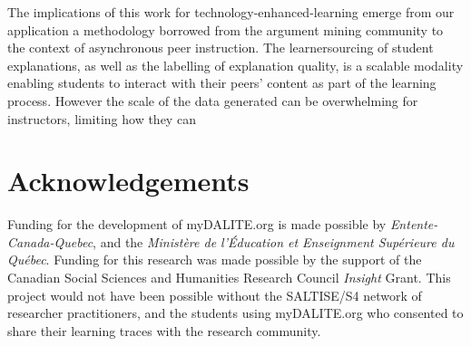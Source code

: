 \documentclass[runningheads]{llncs}
\begin{document}
The implications of this work for technology-enhanced-learning emerge from our 
application a methodology borrowed from the argument mining community to the 
context of asynchronous peer instruction. 
The learnersourcing of student explanations, as well as the labelling of 
explanation quality, is a scalable modality enabling students to interact with 
their peers' content as part of the learning process.
However the scale of the data generated can be overwhelming for instructors, 
limiting how they can 

\section{Acknowledgements}
Funding for the development of myDALITE.org is made possible by 
\textit{Entente-Canada-Quebec}, and the \textit{Ministère de 
	l'Éducation et Enseignment Supérieure du Québec}. Funding for this research 
	was 
made possible by the support of the Canadian Social Sciences and Humanities 
Research Council \textit{Insight} Grant. This project would 
not have been possible without the SALTISE/S4 network of researcher 
practitioners, and the students using myDALITE.org who consented to share 
their learning traces with the research community.

 
 
\end{document}
